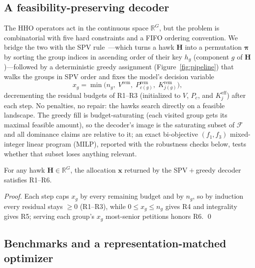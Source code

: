 \documentclass[runningheads]{llncs}
\begin{document}
\subsection{A feasibility-preserving decoder}
\label{sec:decoder}

The HHO operators act in the continuous space $\mathbb{R}^{G}$, but the problem is combinatorial with five hard constraints and a FIFO ordering convention. We bridge the two with the SPV rule~\cite{bean,tasgetiren}---which turns a hawk $\mathbf{H}$ into a permutation $\boldsymbol{\pi}$ by sorting the group indices in ascending order of their key $h_g$ (component $g$ of $\mathbf{H}$)---followed by a deterministic greedy assignment (Figure~\ref{fig:pipeline}) that walks the groups in SPV order and fixes the model's decision variable
\begin{equation}
x_g = \min\!\bigl(n_g,\; V^{\text{rem}},\; P^{\text{rem}}_{c(g)},\; K^{\text{rem}}_{j(g)}\bigr),
\label{eq:greedy}
\end{equation}
decrementing the residual budgets of R1--R3 (initialized to $V$, $P_c$, and $K_j^{\text{eff}}$) after each step. No penalties, no repair: the hawks search directly on a feasible landscape. The greedy fill is budget-saturating (each visited group gets its maximal feasible amount), so the decoder's image is the saturating subset of $\mathcal{F}$ and all dominance claims are relative to it; an exact bi-objective $(f_1,f_3)$ mixed-integer linear program (MILP), reported with the robustness checks below, tests whether that subset loses anything relevant.

\begin{proposition}
\label{prop:feas}
For any hawk $\mathbf{H}\in\mathbb{R}^{G}$, the allocation $\mathbf{x}$ returned by the SPV${}+{}$greedy decoder satisfies R1--R6.
\end{proposition}

\begin{proof}
Each step caps $x_g$ by every remaining budget and by $n_g$, so by induction every residual stays $\ge 0$ (R1--R3), while $0\le x_g\le n_g$ gives R4 and integrality gives R5; serving each group's $x_g$ most-senior petitions honors R6. \qed
\end{proof}

\subsection{Benchmarks and a representation-matched optimizer}
\label{sec:nsga}
\end{document}
